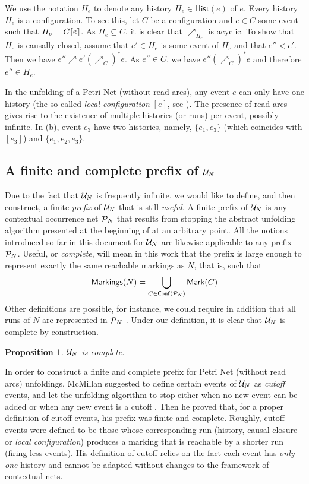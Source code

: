 \documentclass[11pt,a4paper]{article}
\newtheorem{proposition}[theorem]{Proposition}
\newcommand{\hist}[1]{\ensuremath{\mathsf{Hist}(#1)}}
\newcommand{\conf}[1]{\ensuremath{\mathsf{Conf}(#1)}}
\begin{document}
We use the notation $H_e$ to denote any history $H_e \in \hist e$ of $e$.
Every history $H_e$ is a configuration.  To see this, let $C$ be a
configuration and $e \in C$ some event such that $H_e = C [\![ e]\!]$.  As $H_e
\subseteq C$, it is clear that $\nearrow_{H_e}$ is acyclic.  To show that $H_e$
is causally closed, assume that $e' \in H_e$ is some event of $H_e$ and that
$e'' < e'$.  Then we have $e'' \nearrow e' (\nearrow_C)^* e$.  As $e'' \in C$,
we have $e'' (\nearrow_C)^* e$ and therefore $e'' \in H_e$.

In the unfolding of a Petri Net (without read arcs), any event $e$ can only
have one history (the so called \emph{local configuration} $[e]$, see
).  The presence of read arcs gives rise to the existence of
multiple histories (or runs) per event, possibly infinite.  In 
(b), event $e_3$ have two histories, namely, $\{e_1, e_3\}$ (which coincides
with $[e_3]$) and $\{e_1, e_2, e_3\}$.


\subsection{A finite and complete prefix of $\mathcal{U}_{N}$}

Due to the fact that $\mathcal{U}_{N}$ is frequently infinite, we would like to define,
and then construct, a finite \emph{prefix} of $\mathcal{U}_{N}$ that is still
\emph{useful}.  A finite prefix of $\mathcal{U}_{N}$ is any contextual occurrence net
$\mathcal{P}_{N}$ that results from stopping the abstract unfolding algorithm presented
at the beginning of  at an arbitrary point.  All the
notions introduced so far in this document for $\mathcal{U}_{N}$ are likewise applicable
to any prefix $\mathcal{P}_{N}$.  Useful, or \emph{complete}, will mean in this work
that the prefix is large enough to represent exactly the same reachable
markings as $N$, that is, such that $$\markings N = \bigcup_{C \in \conf{\pref
N}} \marking{C}$$ Other definitions are possible, for instance, we could
require in addition that all runs of $N$ are represented in $\mathcal{P}_{N}$
.  Under our definition, it is clear that $\mathcal{U}_{N}$ is complete by
construction.

\begin{proposition}
\label{pro:unf.is}
$\mathcal{U}_{N}$ is complete.
\end{proposition}

In order to construct a finite and complete prefix for Petri Net (without read
arcs) unfoldings, McMillan suggested to define certain events of $\mathcal{U}_{N}$ as
\emph{cutoff} events, and let the unfolding algorithm to stop either when no
new event can be added or when any new event is a cutoff .  Then he
proved that, for a proper definition of cutoff events, his prefix was finite
and complete.  Roughly, cutoff events were defined to be those whose
corresponding run (history, causal closure or \emph{local configuration})
produces a marking that is reachable by a shorter run (firing less events).
His definition of cutoff relies on the fact each event has \emph{only one}
history and cannot be adapted without changes to the framework of contextual
nets.
\end{document}
